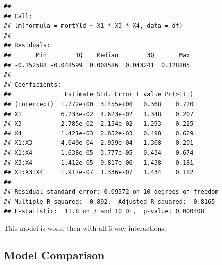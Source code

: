 \documentclass[
  12pt,
]{article}
\newenvironment{Shaded}{\begin{snugshade}}{\end{snugshade}}
\newcommand{\AttributeTok}[1]{\textcolor[rgb]{0.13,0.29,0.53}{#1}}
\newcommand{\CommentTok}[1]{\textcolor[rgb]{0.56,0.35,0.01}{\textit{#1}}}
\newcommand{\FunctionTok}[1]{\textcolor[rgb]{0.13,0.29,0.53}{\textbf{#1}}}
\newcommand{\NormalTok}[1]{#1}
\newcommand{\OtherTok}[1]{\textcolor[rgb]{0.56,0.35,0.01}{#1}}
\newcommand{\SpecialCharTok}[1]{\textcolor[rgb]{0.81,0.36,0.00}{\textbf{#1}}}
\newcommand{\StringTok}[1]{\textcolor[rgb]{0.31,0.60,0.02}{#1}}
\begin{document}
\begin{verbatim}
## 
## Call:
## lm(formula = mortYld ~ X1 * X3 * X4, data = df)
## 
## Residuals:
##       Min        1Q    Median        3Q       Max 
## -0.152588 -0.048599  0.008586  0.043241  0.128805 
## 
## Coefficients:
##               Estimate Std. Error t value Pr(>|t|)
## (Intercept)  1.272e+00  3.455e+00   0.368    0.720
## X1           6.233e-02  4.623e-02   1.348    0.207
## X3           2.785e-02  2.154e-02   1.293    0.225
## X4           1.421e-03  2.852e-03   0.498    0.629
## X1:X3       -4.049e-04  2.959e-04  -1.368    0.201
## X1:X4       -1.638e-05  3.777e-05  -0.434    0.674
## X3:X4       -1.412e-05  9.817e-06  -1.438    0.181
## X1:X3:X4     1.917e-07  1.336e-07   1.434    0.182
## 
## Residual standard error: 0.09572 on 10 degrees of freedom
## Multiple R-squared:  0.892,  Adjusted R-squared:  0.8165 
## F-statistic:  11.8 on 7 and 10 DF,  p-value: 0.000408
\end{verbatim}

This model is worse then with all 3-way interactions.

\subsection{Model Comparison}\label{model-comparison}

\begin{Shaded}
\end{Shaded}
\end{document}
